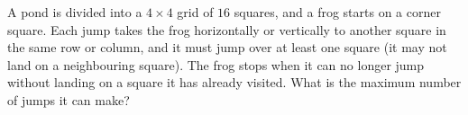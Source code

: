 A pond is divided into a $4\times4$ grid of $16$ squares, and a frog starts on a corner square. Each jump takes the frog horizontally or vertically to another square in the same row or column, and it must jump over at least one square (it may not land on a neighbouring square). The frog stops when it can no longer jump without landing on a square it has already visited. What is the maximum number of jumps it can make?
